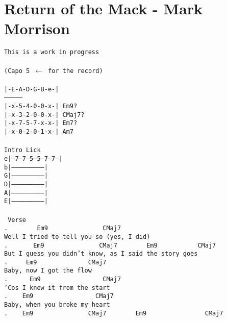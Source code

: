 \newpage
\section{Return of the Mack - Mark Morrison}
\label{Return of the Mack - Mark Morrison}
\texttt{This is a work in progress\\
\\
(Capo 5 $\leftarrow$ for the record)\\
\\
|-E-A-D-G-B-e-|\\
---------------\\
|-x-5-4-0-0-x-| Em9?\\
|-x-3-2-0-0-x-| CMaj7?\\
|-x-7-5-7-x-x-| Em7?\\
|-x-0-2-0-1-x-| Am7\\
\\
\lbrack Intro Lick \rbrack\\
e|---7---7---5---5---7---7---|\\
b|---------------------------|\\
G|---------------------------|\\
D|---------------------------|\\
A|---------------------------|\\
E|---------------------------|\\
\\
\lbrack\ Verse\rbrack\\
. \ \ \ \ \ \ \ Em9\ \ \ \ \ \ \ \ \ \ \ \ \ \ \ CMaj7\\
Well\ I\ tried\ to\ tell\ you\ so\ (yes,\ I\ did)\\
. \ \ \ \ \ \ Em9\ \ \ \ \ \ \ \ \ \ \ \ \ \ \ CMaj7\ \ \ \ \ \ \ \ Em9\ \ \ \ \ \ \ \ \ \ \ CMaj7\\
But\ I\ guess\ you\ didn't\ know,\ as\ I\ said\ the\ story\ goes\\
. \ \ \ \ Em9\ \ \ \ \ \ \ \ \ \ \ \ \ \ CMaj7\\
Baby,\ now\ I\ got\ the\ flow\\
. \ \ \ \ \ Em9\ \ \ \ \ \ \ \ \ \ \ \ \ \ \ \ \ CMaj7\\
'Cos\ I\ knew\ it\ from\ the\ start\\
. \ \ \ Em9\ \ \ \ \ \ \ \ \ \ \ \ \ \ \ \ \ CMaj7\\
Baby,\ when\ you\ broke\ my\ heart\\
. \ \ \ Em9\ \ \ \ \ \ \ \ \ \ \ \ \ \ \ CMaj7\ \ \ \ \ \ \ \ Em9\ \ \ \ \ \ \ \ \ \ \ \ \ \ \ \ CMaj7\\
}
